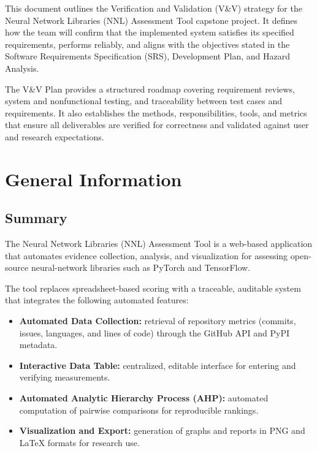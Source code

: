 \documentclass[12pt, titlepage]{article}
\begin{document}
This document outlines the Verification and Validation (V\&V) strategy for the
Neural Network Libraries (NNL) Assessment Tool capstone project. It defines how
the team will confirm that the implemented system satisfies its specified
requirements, performs reliably, and aligns with the objectives stated in the
Software Requirements Specification (SRS), Development Plan, and Hazard
Analysis.

The V\&V Plan provides a structured roadmap covering requirement reviews,
system and nonfunctional testing, and traceability between test cases and
requirements. It also establishes the methods, responsibilities, tools, and
metrics that ensure all deliverables are verified for correctness and validated
against user and research expectations.

\section{General Information}

\subsection{Summary}

The Neural Network Libraries (NNL) Assessment Tool is a web-based application
that automates evidence collection, analysis, and visualization for assessing
open-source neural-network libraries such as PyTorch and TensorFlow.

The tool replaces spreadsheet-based scoring with a traceable, auditable system
that integrates the following automated features:

\begin{itemize}
  \item \textbf{Automated Data Collection:} retrieval of repository metrics
  (commits, issues, languages, and lines of code) through the GitHub API and
  PyPI metadata.

  \item \textbf{Interactive Data Table:} centralized, editable interface for
  entering and verifying measurements.

  \item \textbf{Automated Analytic Hierarchy Process (AHP):} automated
  computation of pairwise comparisons for reproducible rankings.

  \item \textbf{Visualization and Export:} generation of graphs and reports in
  PNG and \LaTeX{} formats for research use.
\end{itemize}
\end{document}

